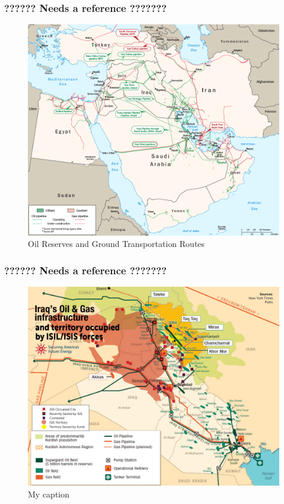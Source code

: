 \documentclass{report}
\begin{document}
\subsubsection{??????  Needs a reference   ???????}

\begin{figure}[H]
 \centering
 \includegraphics[trim = 0cm 0cm 0cm 0cm, clip,scale=0.4]{./figures/oil_reserves.png}
   \caption{Oil Reserves and Ground Transportation Routes}
     \label{fig:oil_reserves}
\end{figure}


\subsubsection{??????  Needs a reference   ???????}

\begin{figure}[H]
 \centering
 \includegraphics[trim = 0cm 0cm 0cm 0cm, clip,scale=0.3]{./figures/oil_infrastructure.jpg}
   \caption{My caption}
     \label{fig:oil_infrastructure}
\end{figure}
\end{document}
